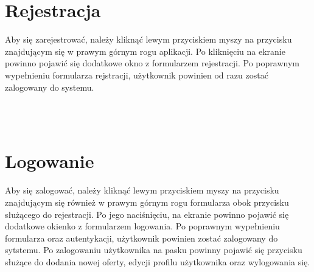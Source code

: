 \section{Rejestracja}
\label{sec:rejestracja}
Aby się zarejestrować, należy kliknąć lewym przyciskiem myszy na przycisku  znajdującym się w prawym górnym rogu aplikacji. Po kliknięciu na ekranie powinno pojawić się dodatkowe okno z formularzem rejestracji. Po poprawnym wypełnieniu formularza rejstracji, użytkownik powinien od razu zostać zalogowany do systemu.\\
\\
\begin{minipage}{\linewidth}
\label{registration}
\end{minipage}\\

\newpage

\section{Logowanie}
\label{sec:logowanie}
Aby się zalogować, należy kliknąć lewym przyciskiem myszy na przycisku  znajdującym się również w prawym górnym rogu formularza obok przycisku służącego do rejestracji. Po jego naciśnięciu, na ekranie powinno pojawić się dodatkowe okienko z formularzem logowania. Po poprawnym wypełnieniu formularza oraz autentykacji, użytkownik powinien zostać zalogowany do sytstemu. 
Po zalogowaniu użytkownika na pasku powinny pojawić się przycisku służące do dodania nowej oferty, edycji profilu użytkownika oraz wylogowania się.\\
\\

